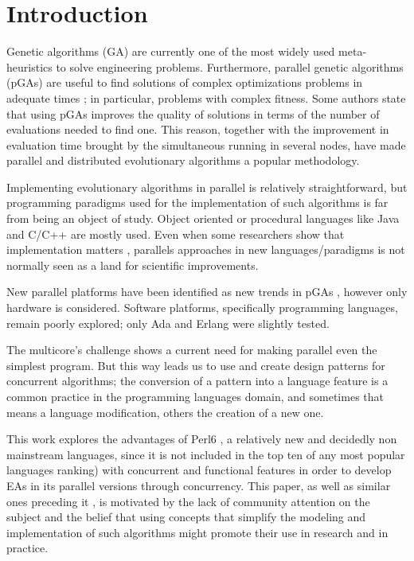 \documentclass[sigconf]{acmart}
\begin{document}
\section{Introduction}

\noindent Genetic algorithms (GA) \cite{GA_Goldberg89} are currently
one of the most widely used meta-heuristics to solve engineering
problems. Furthermore, parallel genetic algorithms (pGAs) are useful
to find  solutions of complex optimizations problems in adequate times
\cite{Luque2011}; in particular, problems with complex fitness. Some
authors \cite{Alba2001} state that using pGAs improves the quality of
solutions in terms of the number of evaluations needed to find
one. This reason, together with the improvement in evaluation time
brought by the simultaneous running in several nodes, have made
parallel and distributed evolutionary algorithms a popular
methodology. 

Implementing  evolutionary algorithms in parallel is relatively straightforward,
but programming paradigms used for the implementation of such
algorithms is far from being an object of study. Object oriented or
procedural languages like Java and C/C++ are mostly used. Even when
some researchers show that implementation matters
\cite{DBLP:conf/iwann/MereloRACML11}, parallels approaches in new
languages/paradigms is not normally seen as a land for scientific
improvements. 

New parallel platforms have been identified as new trends in pGAs \cite{Luque2011}, however only hardware is considered. Software platforms, specifically programming languages, remain poorly explored; only Ada \cite{Santos2002} and Erlang \cite{A.Bienz2011,Kerdprasop2013} were slightly tested.

The multicore’s challenge \cite{SutterL05} shows a current need for making parallel even the simplest program. But this way leads us to use and create design patterns for concurrent algorithms; the conversion of a pattern into a language feature is a common practice in the programming languages domain, and sometimes that means a language modification, others the creation of a new one. 

This work explores the advantages of Perl6
\cite{Tang:2007:PRI:1190216.1190218},  a relatively new and decidedly
non mainstream languages, since it is not included in the top ten of
any most popular languages ranking) with concurrent and functional
features in order to develop EAs in its parallel versions through
concurrency. This paper, as well as similar ones preceding it \cite{DBLP:conf/gecco/CruzGGC13,Albert-Cruz2014169}, is
motivated by the lack of community attention on the subject and the
belief that using concepts that simplify the modeling and
implementation of such algorithms might promote their use in research
and in practice. 
\end{document}

